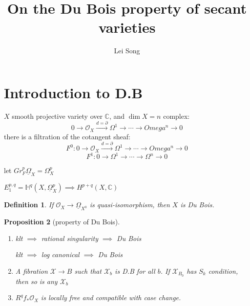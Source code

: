 \documentclass{article}
\title{On the Du Bois property of secant varieties}
\author{ Lei Song}
\newtheorem{definition}{Definition}[section]
\newtheorem{proposition}[definition]{Proposition}
\begin{document}
\maketitle
\section{Introduction to D.B}
$X$ smooth projective variety over $\mathbb{C}$, and $ \dim X =n $
complex:
\[
  0\to \mathcal{O}_{X} \xrightarrow{d=\partial} \Omega^{1}\to \cdots \to Omega^{n}\to 0
\]
there is a filtration of the cotangent sheaf:
\[
  F^{0}: 0\to \mathcal{O}_{X} \xrightarrow{d=\partial} \Omega^{1}\to \cdots \to Omega^{n}\to 0
\]
\[
  F^{1}: 0\to  \Omega^{1}\to \cdots \to \Omega^{n}\to 0
\]

let $ Gr^{p}_{F}\underline{\Omega}_{X}^{\cdot}=\Omega_{X}^{p}$

$ E_{1}^{p,q}=\mathbb{H}^{q}(X,\underline{\Omega}_{X}^{p}) \implies H^{p+q}(X,\mathbb{C}) $

\begin{definition}
  If $ \mathcal{O}_{X}\to \underline{\Omega}_{X^{0}} $ is quasi-isomorphism, then $ X $ is Du Bois.
\end{definition}

\begin{proposition}[property of Du Bois]
  \begin{enumerate}
    \item 
      klt $\implies $ rational singularity $\implies $ Du Bois

      klt $\implies $ log canonical $\implies $ Du Bois
    \item A fibration $ \mathcal{X}\to B $ such that $ \mathcal{X}_{b} $ is D.B for all $b$. If $ \mathcal{X}_{B_{0}} $ has $ S_{k} $ condition, then so is any $ \mathcal{X}_{b} $
      \item $ R^{q}f_{*}\mathcal{O}_{X} $ is locally free and compatible with case change.
  \end{enumerate}
\end{proposition}
\end{document}
